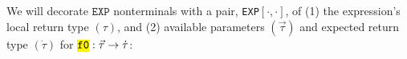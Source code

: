 \documentclass[sigplan,nonacm]{acmart}\settopmatter{printfolios=false,printccs=false,printacmref=false}
\newcommand{\codett}[1]{\texttt{\hl{#1}}}
\begin{document}
  \begin{tiny}
  \begin{prooftree}
  \end{prooftree}
  \end{tiny}
  We will decorate $\texttt{EXP}$ nonterminals with a pair, \texttt{EXP}$[\cdot, \cdot]$, of (1) the expression's local return type $(\tau)$, and (2) available parameters $(\vec\tau)$ and expected return type $(\dot\tau)$ for $\codett{f0}:\vec\tau\rightarrow \dot\tau$:
\end{document}
